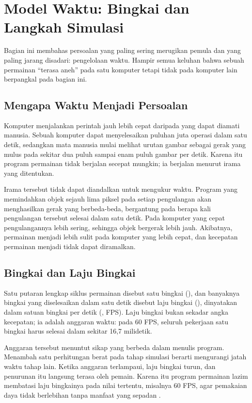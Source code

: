 \section{Model Waktu: Bingkai dan Langkah Simulasi}
\label{sec:model-waktu}

Bagian ini membahas persoalan yang paling sering merugikan pemula dan yang
paling jarang disadari: pengelolaan waktu. Hampir semua keluhan bahwa sebuah
permainan ``terasa aneh'' pada satu komputer tetapi tidak pada komputer lain
berpangkal pada bagian ini.

\subsection{Mengapa Waktu Menjadi Persoalan}

Komputer menjalankan perintah jauh lebih cepat daripada yang dapat diamati
manusia. Sebuah komputer dapat menyelesaikan puluhan juta operasi dalam satu
detik, sedangkan mata manusia mulai melihat urutan gambar sebagai gerak yang
mulus pada sekitar dua puluh sampai enam puluh gambar per detik. Karena itu
program permainan tidak berjalan secepat mungkin; ia berjalan menurut irama
yang ditentukan.

Irama tersebut tidak dapat diandalkan untuk mengukur waktu. Program yang
memindahkan objek sejauh lima piksel pada setiap pengulangan akan
menghasilkan gerak yang berbeda-beda, bergantung pada berapa kali pengulangan
tersebut selesai dalam satu detik. Pada komputer yang cepat pengulangannya
lebih sering, sehingga objek bergerak lebih jauh. Akibatnya, permainan menjadi
lebih sulit pada komputer yang lebih cepat, dan kecepatan permainan menjadi
tidak dapat diramalkan.

\subsection{Bingkai dan Laju Bingkai}

Satu putaran lengkap siklus permainan disebut satu bingkai (),
dan banyaknya bingkai yang diselesaikan dalam satu detik disebut laju bingkai
(), dinyatakan dalam satuan bingkai per detik
(, FPS). Laju bingkai bukan sekadar angka
kecepatan; ia adalah anggaran waktu: pada 60 FPS, seluruh pekerjaan satu
bingkai harus selesai dalam sekitar 16,7 milidetik.

Anggaran tersebut menuntut sikap yang berbeda dalam menulis program.
Menambah satu perhitungan berat pada tahap simulasi berarti mengurangi jatah
waktu tahap lain. Ketika anggaran terlampaui, laju bingkai turun, dan
penurunan itu langsung terasa oleh pemain. Karena itu program permainan lazim
membatasi laju bingkainya pada nilai tertentu, misalnya 60 FPS, agar
pemakaian daya tidak berlebihan tanpa manfaat yang sepadan
\cite{sweigart-mg,pygame-docs}.

